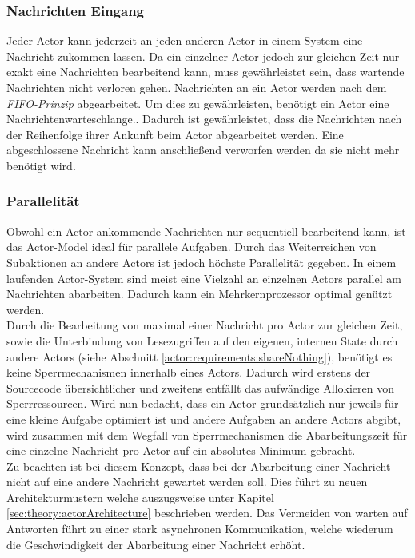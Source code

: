 \subsubsection{Nachrichten Eingang}\label{actor:Mailbox}
Jeder Actor kann jederzeit an jeden anderen Actor in einem System eine Nachricht zukommen lassen. Da ein einzelner Actor jedoch zur gleichen Zeit nur exakt eine Nachrichten bearbeitend kann, muss gewährleistet sein, dass wartende Nachrichten nicht verloren gehen. Nachrichten an ein Actor werden nach dem \textit{FIFO-Prinzip} abgearbeitet. 
 Um dies zu gewährleisten, benötigt ein Actor eine Nachrichtenwarteschlange.\citep{Agha1985ActorsSystems}. Dadurch ist gewährleistet, dass die Nachrichten nach der Reihenfolge ihrer Ankunft beim Actor abgearbeitet werden. Eine abgeschlossene Nachricht kann anschließend verworfen werden da sie nicht mehr benötigt wird. 

\subsubsection{Parallelität}\label{actor:parallelism}
Obwohl ein Actor ankommende Nachrichten nur sequentiell bearbeitend kann, ist das Actor-Model ideal für parallele Aufgaben.\citep{hewitt1973session} Durch das Weiterreichen von Subaktionen an andere Actors ist jedoch höchste Parallelität gegeben. In einem laufenden Actor-System sind meist eine Vielzahl an einzelnen Actors parallel am Nachrichten abarbeiten. Dadurch kann ein Mehrkernprozessor optimal genützt werden. \citep{Agha1985ActorsSystems} \\ 
Durch die Bearbeitung von maximal einer Nachricht pro Actor zur gleichen Zeit, sowie die Unterbindung von Lesezugriffen auf den eigenen, internen State durch andere Actors (siehe Abschnitt \ref{actor:requirements:shareNothing}), benötigt es keine Sperrmechanismen innerhalb eines Actors. Dadurch wird erstens der Sourcecode übersichtlicher und zweitens entfällt das aufwändige Allokieren von Sperrressourcen.\citep{Vernon2015ReactiveAkka}
Wird nun bedacht, dass ein Actor grundsätzlich nur jeweils für eine kleine Aufgabe optimiert ist und andere Aufgaben an andere Actors abgibt, wird zusammen mit dem Wegfall von Sperrmechanismen die Abarbeitungszeit für eine einzelne Nachricht pro Actor auf ein absolutes Minimum gebracht. \citep{Vernon2015ReactiveAkka} \\
Zu beachten ist bei diesem Konzept, dass bei der Abarbeitung einer Nachricht nicht auf eine andere Nachricht gewartet werden soll. Dies führt zu neuen Architekturmustern welche auszugsweise unter Kapitel \ref{sec:theory:actorArchitecture} beschrieben werden. Das Vermeiden von warten auf Antworten führt zu einer stark asynchronen Kommunikation, welche wiederum die Geschwindigkeit der Abarbeitung einer Nachricht erhöht.


